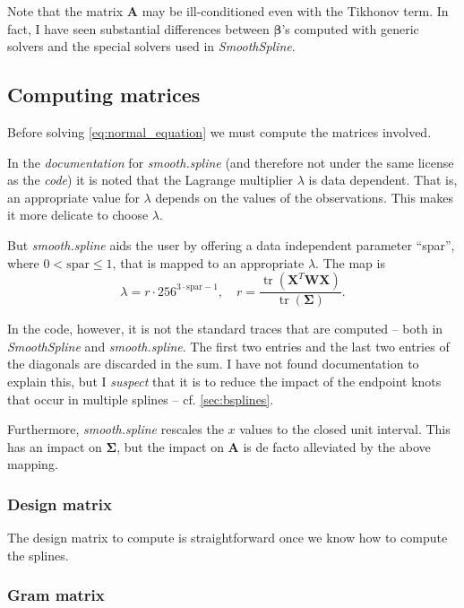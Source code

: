 \documentclass[a4paper]{scrartcl}
\newcommand{\vv}[1]{\ensuremath{\bm{#1}}}
\newcommand{\mat}[1]{\ensuremath{\bm{#1}}}
\newcommand{\T}[1]{\ensuremath{{#1}^{T}}}
\DeclareMathOperator\tr{tr}
\begin{document}
Note that the matrix $\mat A$ may be ill-conditioned even with the Tikhonov term.
In fact, I have seen substantial differences between $\vv\beta$'s computed with generic solvers and the special solvers used in \textit{SmoothSpline}.


\subsection{Computing matrices}

Before solving \cref{eq:normal_equation} we must compute the matrices involved.

In the \textit{documentation} for \textit{smooth.spline} (and therefore not under the same license as the \textit{code}) it is noted that the Lagrange multiplier $\lambda$ is data dependent.
That is, an appropriate value for $\lambda$ depends on the values of the observations.
This makes it more delicate to choose $\lambda$.

But \textit{smooth.spline} aids the user by offering a data independent parameter \enquote{spar}, where $0 < \text{spar} \leq 1$, that is mapped to an appropriate $\lambda$.
The map is
\begin{equation*}
    \lambda = r\cdot 256^{3\cdot\text{spar} - 1},
    \quad
    r = \frac{\tr(\T{\mat X} \mat W \mat X)}{\tr(\mat\Sigma)}.
\end{equation*}

In the code, however, it is not the standard traces that are computed -- both in \textit{SmoothSpline} and \textit{smooth.spline}.
The first two entries and the last two entries of the diagonals are discarded in the sum.
I have not found documentation to explain this, but I \emph{suspect} that it is to reduce the impact of the endpoint knots that occur in multiple splines -- cf. \cref{sec:bsplines}.

Furthermore, \textit{smooth.spline} rescales the $x$ values to the closed unit interval.
This has an impact on $\mat\Sigma$, but the impact on $\mat A$ is de facto alleviated by the above mapping.


\subsubsection{Design matrix}

The design matrix to compute is straightforward once we know how to compute the splines.


\subsubsection{Gram matrix}
\end{document}
